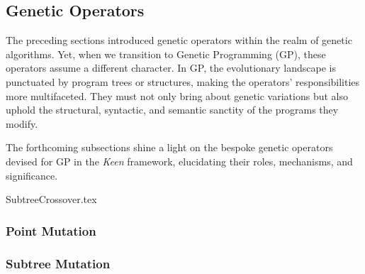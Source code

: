 \subsection{Genetic Operators}
\label{sec:keen:gp:op}
  The preceding sections introduced genetic operators within the realm of genetic 
  algorithms. Yet, when we transition to Genetic Programming (GP), these operators 
  assume a different character. In GP, the evolutionary landscape is punctuated by 
  program trees or structures, making the operators' responsibilities more 
  multifaceted. They must not only bring about genetic variations but also uphold 
  the structural, syntactic, and semantic sanctity of the programs they modify.

  The forthcoming subsections shine a light on the bespoke genetic operators 
  devised for GP in the \textit{Keen} framework, elucidating their roles, 
  mechanisms, and significance.

  {SubtreeCrossover.tex}

  \subsubsection{Point Mutation}
  \label{sec:keen:gp:op:mutation:point}
  \Blindtext

  \subsubsection{Subtree Mutation}
  \label{sec:keen:op:mut:subtree}
  \Blindtext